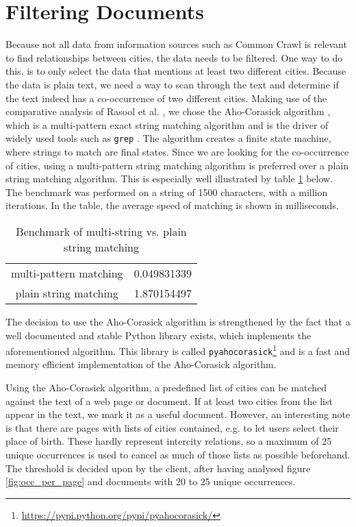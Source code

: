 \section{Filtering Documents} \label{sec:filtering_docs}
Because not all data from information sources such as Common Crawl is relevant to find relationships between cities, the data needs to be filtered. One way to do this, is to only select the data that mentions at least two different cities. Because the data is plain text, we need a way to scan through the text and determine if the text indeed has a co-occurrence of two different cities.
Making use of the comparative analysis of Rasool et al. \cite{rasool2012string}, we chose the Aho-Corasick algorithm \cite{Aho-Corasick}, which is a multi-pattern exact string matching algorithm and is the driver of widely used tools such as \texttt{grep} \cite{kernighan1984unix}. The algorithm creates a finite state machine, where strings to match are final states. Since we are looking for the co-occurrence of cities, using a multi-pattern string matching algorithm is preferred over a plain string matching algorithm. This is especially well illustrated by table \ref{tab:bm-matching} below. The benchmark was performed on a string of 1500 characters, with a million iterations. In the table, the average speed of matching is shown in milliseconds.

\begin{table}
\centering
\begin{tabular}{ |c|c| } 
    \hline
    multi-pattern matching & 0.049831339 \\
    plain string matching &  1.870154497 \\
    \hline
\end{tabular}
\caption{Benchmark of multi-string vs. plain string matching}
\label{tab:bm-matching}
\end{table}

The decision to use the Aho-Corasick algorithm is strengthened by the fact that a well documented and stable Python library exists, which implements the aforementioned algorithm. This library is called \texttt{pyahocorasick}\footnote{\url{https://pypi.python.org/pypi/pyahocorasick/}} and is a fast and memory efficient implementation of the Aho-Corasick algorithm.

Using the Aho-Corasick algorithm, a predefined list of cities can be matched against the text of a web page or document. If at least two cities from the list appear in the text, we mark it as a useful document. However, an interesting note is that there are pages with lists of cities contained, e.g. to let users select their place of birth. These hardly represent intercity relations, so a maximum of 25 unique occurrences is used to cancel as much of those lists as possible beforehand. The threshold is decided upon by the client, after having analysed figure \ref{fig:occ_per_page} and documents with 20 to 25 unique occurrences.


